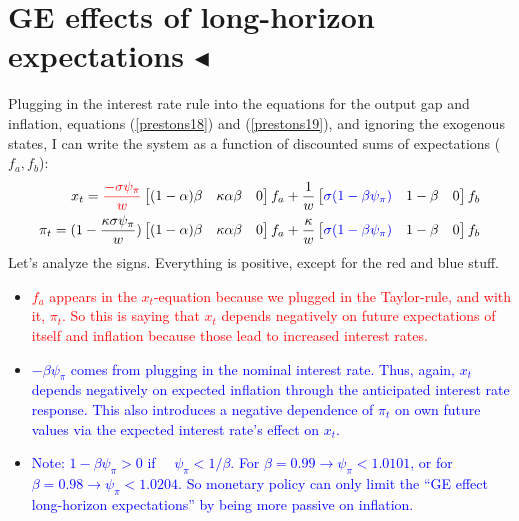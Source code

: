 \documentclass[11pt]{article}
\renewcommand{\[}{\begin{equation}}
\renewcommand{\]}{\end{equation}}
\begin{document}
\section{GE effects of long-horizon expectations $\blacktriangleleft$}
Plugging in the interest rate rule into the equations for the output gap and inflation, equations (\ref{prestons18}) and (\ref{prestons19}), and ignoring the exogenous states, I can write the system as a function of discounted sums of expectations ($f_a, f_b$):
\begin{align}
x_t = \textcolor{red}{\frac{-\sigma\psi_{\pi}}{w}} \begin{bmatrix} (1-\alpha)\beta&\kappa\alpha\beta & 0 \end{bmatrix} f_a + \frac{1}{w}\begin{bmatrix} \textcolor{blue}{\sigma(1-\beta\psi_{\pi})}&1-\beta & 0\end{bmatrix} f_b \\
\pi_t = (1-\frac{\kappa\sigma\psi_{\pi}}{w}) \begin{bmatrix} (1-\alpha)\beta&\kappa\alpha\beta & 0 \end{bmatrix} f_a + \frac{\kappa}{w}\begin{bmatrix}  \textcolor{blue}{\sigma(1-\beta\psi_{\pi})}&1-\beta & 0\end{bmatrix} f_b
\end{align}
Let's analyze the signs. Everything is positive, except for the red and blue stuff. 
\begin{itemize}
\item \textcolor{red}{$f_a$ appears in the $x_t$-equation because we plugged in the Taylor-rule, and with it, $\pi_t$. So this is saying that $x_t$ depends negatively on future expectations of itself and inflation because those lead to increased interest rates.}
\item \textcolor{blue}{$-\beta\psi_{\pi}$ comes from plugging in the nominal interest rate. Thus, again, $x_t$ depends negatively on expected inflation through the anticipated interest rate response. This also introduces a negative dependence of $\pi_t$ on own future values via the expected interest rate's effect on $x_t$.}
\item[] \textcolor{blue}{Note: $1-\beta\psi_{\pi} > 0 $ if $\quad \psi_{\pi} < 1/\beta$. For $\beta=0.99 \rightarrow \psi_{\pi} < 1.0101$, or for $\beta=0.98 \rightarrow \psi_{\pi} < 1.0204$. So monetary policy can only limit the ``GE effect long-horizon expectations'' by being more passive on inflation.} 
\end{itemize}
\end{document}
